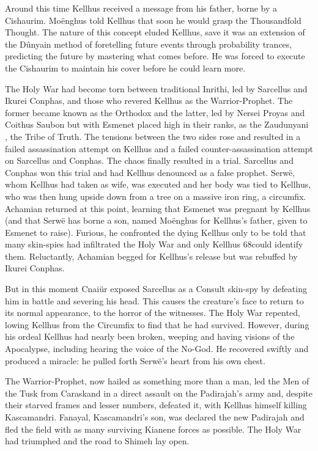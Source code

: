 \documentclass[]{book}
\begin{document}
Around this time Kellhus received a message from his father, borne by a Cishaurim.
Moënghus told Kellhus that soon he would grasp the Thousandfold Thought. The
nature of this concept eluded Kellhus, save it was an extension of the Dûnyain method
of foretelling future events through probability trances, predicting the future by
mastering what comes before. He was forced to execute the Cishaurim to maintain his
cover before he could learn more.

The Holy War had become torn between traditional Inrithi, led by Sarcellus and Ikurei
Conphas, and those who revered Kellhus as the Warrior-Prophet. The former became
known as the Orthodox and the latter, led by Nersei Proyas and Coithus Saubon but
with Esmenet placed high in their ranks, as the Zaudunyani , the Tribe of Truth. The
tensions between the two sides rose and resulted in a failed assassination attempt on
Kellhus and a failed counter-assassination attempt on Sarcellus and Conphas. The
chaos finally resulted in a trial. Sarcellus and Conphas won this trial and had Kellhus
denounced as a false prophet. Serwë, whom Kellhus had taken as wife, was executed
and her body was tied to Kellhus, who was then hung upside down from a tree on a
massive iron ring, a circumfix. Achamian returned at this point, learning that Esmenet
was pregnant by Kellhus (and that Serwë has borne a son, named Moënghus for
Kellhus's father, given to Esmenet to raise). Furious, he confronted the dying Kellhus
only to be told that many skin-spies had infiltrated the Holy War and only Kellhus
68could identify them. Reluctantly, Achamian begged for Kellhus's release but was
rebuffed by Ikurei Conphas.

But in this moment Cnaiür exposed Sarcellus as a Consult skin-spy by defeating him in
battle and severing his head. This causes the creature's face to return to its normal
appearance, to the horror of the witnesses. The Holy War repented, lowing Kellhus
from the Circumfix to find that he had survived. However, during his ordeal Kellhus
had nearly been broken, weeping and having visions of the Apocalypse, including
hearing the voice of the No-God. He recovered swiftly and produced a miracle: he
pulled forth Serwë's heart from his own chest.

The Warrior-Prophet, now hailed as something more than a man, led the Men of the
Tusk from Caraskand in a direct assault on the Padirajah's army and, despite their
starved frames and lesser numbers, defeated it, with Kellhus himself killing
Kascamandri. Fanayal, Kascamandri's son, was declared the new Padirajah and fled the
field with as many surviving Kianene forces as possible. The Holy War had triumphed
and the road to Shimeh lay open.
\end{document}
